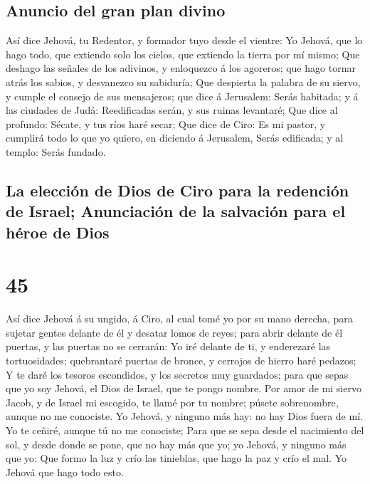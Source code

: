 \hypertarget{anuncio-del-gran-plan-divino}{%
\subsection{Anuncio del gran plan
divino}\label{anuncio-del-gran-plan-divino}}

 Así dice Jehová, tu Redentor, y formador tuyo desde el
vientre: Yo Jehová, que lo hago todo, que extiendo solo los cielos, que
extiendo la tierra por mí mismo;  Que deshago las señales
de los adivinos, y enloquezco á los agoreros; que hago tornar atrás los
sabios, y desvanezco su sabiduría;  Que despierta la
palabra de su siervo, y cumple el consejo de sus mensajeros; que dice á
Jerusalem: Serás habitada; y á las ciudades de Judá: Reedificadas serán,
y sus ruinas levantaré;  Que dice al profundo: Sécate, y
tus ríos haré secar;  Que dice de Ciro: Es mi pastor, y
cumplirá todo lo que yo quiero, en diciendo á Jerusalem, Serás
edificada; y al templo: Serás fundado.

\hypertarget{la-elecciuxf3n-de-dios-de-ciro-para-la-redenciuxf3n-de-israel-anunciaciuxf3n-de-la-salvaciuxf3n-para-el-huxe9roe-de-dios}{%
\subsection{La elección de Dios de Ciro para la redención de Israel;
Anunciación de la salvación para el héroe de
Dios}\label{la-elecciuxf3n-de-dios-de-ciro-para-la-redenciuxf3n-de-israel-anunciaciuxf3n-de-la-salvaciuxf3n-para-el-huxe9roe-de-dios}}

\hypertarget{section-44}{%
\section{45}\label{section-44}}

 Así dice Jehová á su ungido, á Ciro, al cual tomé yo por
su mano derecha, para sujetar gentes delante de él y desatar lomos de
reyes; para abrir delante de él puertas, y las puertas no se cerrarán:
 Yo iré delante de ti, y enderezaré las tortuosidades;
quebrantaré puertas de bronce, y cerrojos de hierro haré pedazos;
 Y te daré los tesoros escondidos, y los secretos muy
guardados; para que sepas que yo soy Jehová, el Dios de Israel, que te
pongo nombre.  Por amor de mi siervo Jacob, y de Israel mi
escogido, te llamé por tu nombre; púsete sobrenombre, aunque no me
conociste.  Yo Jehová, y ninguno más hay: no hay Dios
fuera de mí. Yo te ceñiré, aunque tú no me conociste; 
Para que se sepa desde el nacimiento del sol, y desde donde se pone, que
no hay más que yo; yo Jehová, y ninguno más que yo:  Que
formo la luz y crío las tinieblas, que hago la paz y crío el mal. Yo
Jehová que hago todo esto.

